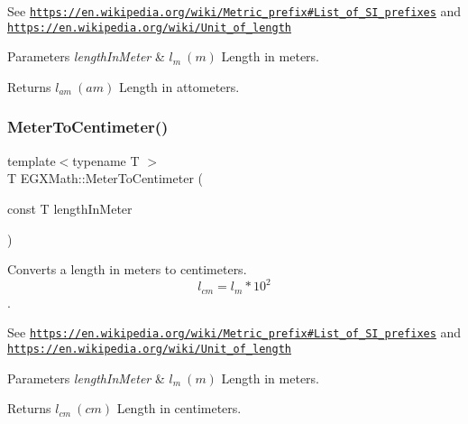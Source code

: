 See \href{https://en.wikipedia.org/wiki/Metric_prefix#List_of_SI_prefixes}{\tt https\+://en.\+wikipedia.\+org/wiki/\+Metric\+\_\+prefix\#\+List\+\_\+of\+\_\+\+S\+I\+\_\+prefixes} and \href{https://en.wikipedia.org/wiki/Unit_of_length}{\tt https\+://en.\+wikipedia.\+org/wiki/\+Unit\+\_\+of\+\_\+length} 
\begin{DoxyParams}{Parameters}
{\em length\+In\+Meter} & $ l_{m}\ (m)$ Length in meters. \\
\hline
\end{DoxyParams}
\begin{DoxyReturn}{Returns}
$ l_{am}\ (am)$ Length in attometers. 
\end{DoxyReturn}
\mbox{\label{group___e_g_x_math-_conversions-_length_conversions-_meter-_s_i_gab70c34d0ee4bf48225d48e48b28f808a}} 
\subsubsection{\texorpdfstring{Meter\+To\+Centimeter()}{MeterToCentimeter()}}
{\footnotesize\ttfamily template$<$typename T $>$ \\
T E\+G\+X\+Math\+::\+Meter\+To\+Centimeter (\begin{DoxyParamCaption}\item[{const T}]{length\+In\+Meter }\end{DoxyParamCaption})}



Converts a length in meters to centimeters. \[ l_{cm}=l_{m} * 10^{2} \]. 

See \href{https://en.wikipedia.org/wiki/Metric_prefix#List_of_SI_prefixes}{\tt https\+://en.\+wikipedia.\+org/wiki/\+Metric\+\_\+prefix\#\+List\+\_\+of\+\_\+\+S\+I\+\_\+prefixes} and \href{https://en.wikipedia.org/wiki/Unit_of_length}{\tt https\+://en.\+wikipedia.\+org/wiki/\+Unit\+\_\+of\+\_\+length} 
\begin{DoxyParams}{Parameters}
{\em length\+In\+Meter} & $ l_{m}\ (m)$ Length in meters. \\
\hline
\end{DoxyParams}
\begin{DoxyReturn}{Returns}
$ l_{cm}\ (cm)$ Length in centimeters. 
\end{DoxyReturn}
\mbox{\label{group___e_g_x_math-_conversions-_length_conversions-_meter-_s_i_ga1b18e63d03025512566c5f55ad4e0c89}} 
